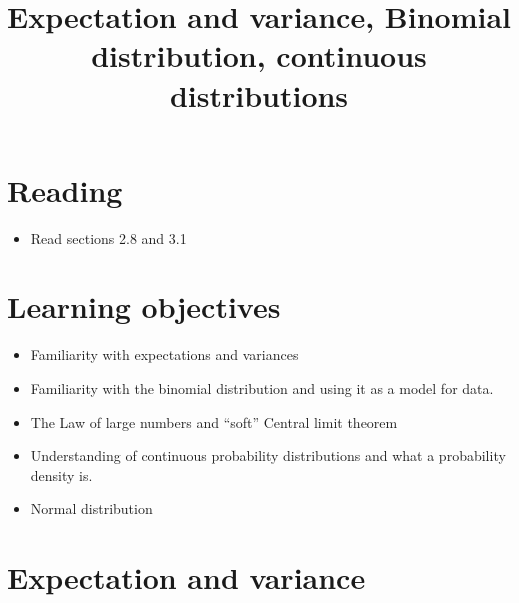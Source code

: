 


\title{Expectation and variance, Binomial distribution, continuous distributions}

\maketitle
\tableofcontents

\section{Reading}
\begin{itemize}
\item Read sections 2.8 and 3.1 \cite{tabak}
\end{itemize}

\section{Learning objectives}

\begin{itemize}
\item Familiarity with expectations and variances 
\item Familiarity with the binomial distribution and using it as a model for data. 
\item The Law of large numbers and ``soft''  Central limit theorem
\item Understanding of continuous probability distributions and what a probability density is.
\item Normal distribution
\end{itemize}




\section{Expectation and  variance}




